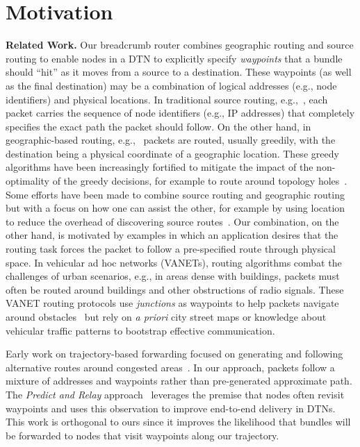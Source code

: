 \section{Motivation}
{\bf Related Work.}
Our {\sc breadcrumb} router combines geographic routing and source routing to enable nodes in a DTN to explicitly specify {\em waypoints} that a bundle should ``hit'' as it moves from a source to a destination. These waypoints (as well as the final destination) may be a combination of logical addresses (e.g., node identifiers) and physical locations. In traditional source routing, e.g.,~\cite{johnson96:dynamic}, each packet carries the sequence of node identifiers (e.g., IP addresses) that completely specifies the exact path the packet should follow. On the other hand, in geographic-based routing, e.g.,~\cite{florian13:overdrive, karp00:gpsr, navas97:geocast} packets are routed, usually greedily, with the destination being a physical coordinate of a geographic location. These greedy algorithms have been increasingly fortified to mitigate the impact of the non-optimality of the greedy decisions, for example to route around topology holes~\cite{tian03:spatially}. Some efforts have been made to combine source routing and geographic routing but with a focus on how one can assist the other, for example by using location to reduce the overhead of discovering source routes~\cite{basagni99:dynamic}. Our combination, on the other hand, is motivated by examples in which an application desires that the routing task forces the packet to follow a pre-specified route through physical space.  In vehicular ad hoc networks (VANETs), routing algorithms combat the challenges of urban scenarios, e.g., in areas dense with buildings, packets must often be routed around buildings and other obstructions of radio signals. These VANET routing protocols use {\em junctions} as waypoints to help packets navigate around obstacles~\cite{jerbi07:improved, lochert05:geographic} but rely on {\em a priori} city street maps or knowledge about vehicular traffic patterns to bootstrap effective communication.

Early work on trajectory-based forwarding focused on generating and following alternative routes around congested areas~\cite{niculescu03:TBF}. In our approach, packets follow a mixture of addresses and waypoints rather than pre-generated approximate path. The {\em Predict and Relay} approach~\cite{yuan09:PRE} leverages the premise that nodes often revisit waypoints and uses this observation to improve end-to-end delivery in DTNs. This work is orthogonal to ours since it improves the likelihood that bundles will be forwarded to nodes that visit waypoints along our trajectory.

